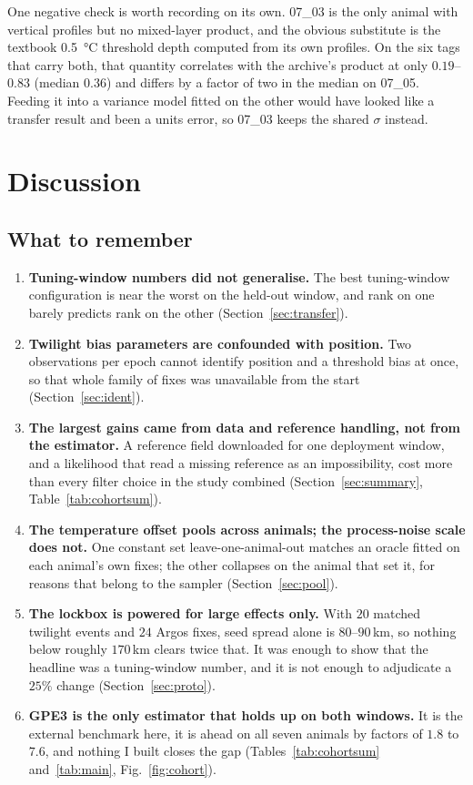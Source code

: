 \documentclass[conference]{IEEEtran}
\begin{document}
One negative check is worth recording on its own. 07\_03 is the only animal
with vertical profiles but no mixed-layer product, and the obvious substitute
is the textbook \SI{0.5}{\celsius} threshold depth computed from its own
profiles. On the six tags that carry both, that quantity correlates with the
archive's product at only $0.19$--$0.83$ (median $0.36$) and differs by a
factor of two in the median on 07\_05. Feeding it into a variance model fitted
on the other would have looked like a transfer result and been a units error,
so 07\_03 keeps the shared $\sigma$ instead.


\section{Discussion}
\subsection{What to remember}
\begin{enumerate}
\item \textbf{Tuning-window numbers did not generalise.} The best
tuning-window configuration is near the worst on the held-out window, and rank
on one barely predicts rank on the other (Section~\ref{sec:transfer}).
\item \textbf{Twilight bias parameters are confounded with position.} Two
observations per epoch cannot identify position and a threshold bias at once,
so that whole family of fixes was unavailable from the start
(Section~\ref{sec:ident}).
\item \textbf{The largest gains came from data and reference handling, not
from the estimator.} A reference field downloaded for one deployment window,
and a likelihood that read a missing reference as an impossibility, cost more
than every filter choice in the study combined (Section~\ref{sec:summary},
Table~\ref{tab:cohortsum}).
\item \textbf{The temperature offset pools across animals; the process-noise
scale does not.} One constant set leave-one-animal-out matches an oracle fitted
on each animal's own fixes; the other collapses on the animal that set it, for
reasons that belong to the sampler (Section~\ref{sec:pool}).
\item \textbf{The lockbox is powered for large effects only.} With $20$
matched twilight events and $24$ Argos fixes, seed spread alone is
$80$--$90$\,\si{\km}, so nothing below roughly $170$\,\si{\km} clears twice
that. It was enough to show that the headline was a tuning-window number, and
it is not enough to adjudicate a $25\%$ change (Section~\ref{sec:proto}).
\item \textbf{GPE3 is the only estimator that holds up on both windows.} It is
the external benchmark here, it is ahead on all seven animals by factors of
$1.8$ to $7.6$, and nothing I built closes the gap (Tables~\ref{tab:cohortsum}
and~\ref{tab:main}, Fig.~\ref{fig:cohort}).
\end{enumerate}
\end{document}
